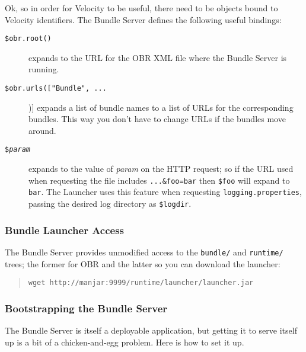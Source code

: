 \documentclass{report}
\begin{document}
\noindent Ok, so in order for Velocity to be useful, there need to be objects bound to
Velocity identifiers. The Bundle Server defines the following useful bindings:

\begin{description}
\item[\tt \$obr.root()] expands to the URL for the OBR XML file where the Bundle
Server is running.
\item[\tt \$obr.urls(["Bundle", ...])] expands a list of bundle names to a list of
URLs for the corresponding bundles. This way you don't have to change URLs if
the bundles move around.
\item[\tt \${\it param}\/] expands to the value of {\it param}\/ on the HTTP request;
so if the URL used when requesting the file includes {\tt ...\&foo=bar} then {\tt \$foo}
will expand to {\tt bar}. The Launcher uses this feature when requesting {\tt logging.properties},
passing the desired log directory as {\tt \$logdir}.
\end{description}


\subsubsection{Bundle Launcher Access}

The Bundle Server provides unmodified access to the {\tt bundle/} and {\tt runtime/} trees;
the former for OBR and the latter so you can download the launcher:

\begin{quote}\begin{scriptsize}\begin{verbatim}
wget http://manjar:9999/runtime/launcher/launcher.jar
\end{verbatim}\end{scriptsize}\end{quote}


\subsubsection{Bootstrapping the Bundle Server}

The Bundle Server is itself a deployable application, but getting it to serve
itself up is a bit of a chicken-and-egg problem. Here is how to set it up.
\end{document}

